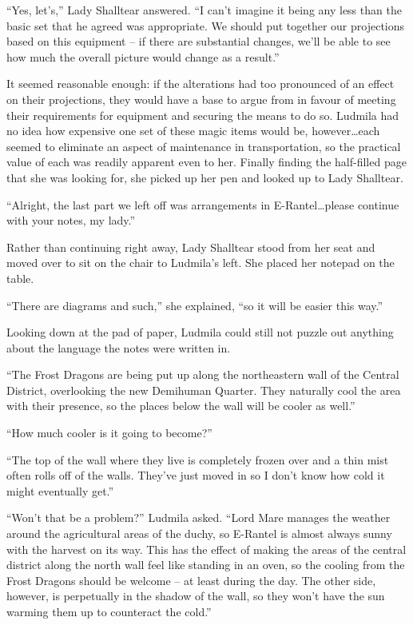  

“Yes, let’s,” Lady Shalltear answered. “I can’t imagine it being any less than the basic set that he agreed was appropriate. We should put together our projections based on this equipment – if there are substantial changes, we’ll be able to see how much the overall picture would change as a result.”

 

It seemed reasonable enough: if the alterations had too pronounced of an effect on their projections, they would have a base to argue from in favour of meeting their requirements for equipment and securing the means to do so. Ludmila had no idea how expensive one set of these magic items would be, however…each seemed to eliminate an aspect of maintenance in transportation, so the practical value of each was readily apparent even to her. Finally finding the half-filled page that she was looking for, she picked up her pen and looked up to Lady Shalltear.

 

“Alright, the last part we left off was arrangements in E-Rantel…please continue with your notes, my lady.”

 

Rather than continuing right away, Lady Shalltear stood from her seat and moved over to sit on the chair to Ludmila’s left. She placed her notepad on the table.

 

“There are diagrams and such,” she explained, “so it will be easier this way.”

 

Looking down at the pad of paper, Ludmila could still not puzzle out anything about the language the notes were written in.

 

“The Frost Dragons are being put up along the northeastern wall of the Central District, overlooking the new Demihuman Quarter. They naturally cool the area with their presence, so the places below the wall will be cooler as well.”

 

“How much cooler is it going to become?”

 

“The top of the wall where they live is completely frozen over and a thin mist often rolls off of the walls. They’ve just moved in so I don’t know how cold it might eventually get.”

 

“Won’t that be a problem?” Ludmila asked. “Lord Mare manages the weather around the agricultural areas of the duchy, so E-Rantel is almost always sunny with the harvest on its way. This has the effect of making the areas of the central district along the north wall feel like standing in an oven, so the cooling from the Frost Dragons should be welcome – at least during the day. The other side, however, is perpetually in the shadow of the wall, so they won’t have the sun warming them up to counteract the cold.”

